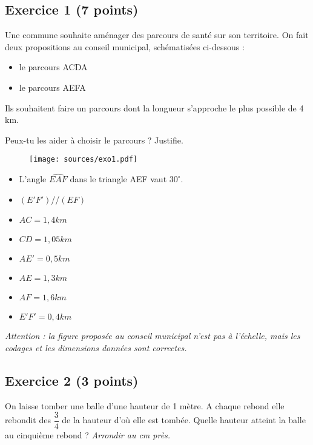 \documentclass[12pt]{article}
\begin{document}
\subsection*{Exercice 1 (7 points)}

Une commune souhaite aménager des parcours de santé sur son territoire. On fait deux propositions au conseil municipal, schématisées ci-dessous :

\begin{itemize}
\item le parcours ACDA
\item le parcours AEFA
\end{itemize}

Ils souhaitent faire un parcours dont la longueur s’approche le plus possible de 4 km.

Peux-tu les aider à choisir le parcours ? Justifie.

\begin{multicols}{2}

  \begin{figure}[H]
    \centering
    \texttt{[image: sources/exo1.pdf]}
  \end{figure}

  \begin{itemize}
  \item L’angle $\widehat{EAF}$ dans le triangle AEF vaut $30^{\circ}$.
  \item $(E' F') $\slash{}\slash{}$ (EF)$
  \item $AC = 1,4 km$
  \item $CD = 1,05 km$
  \item $AE' = 0,5 km$
  \item $AE = 1,3 km$
  \item $AF = 1,6 km$
  \item $E'F' = 0,4 km$  \\
  \end{itemize}

  \textit{Attention : la figure proposée au conseil municipal n’est pas à l’échelle, mais les codages et les dimensions données sont correctes.}
\end{multicols}

\subsection*{Exercice 2 (3 points)}

On laisse tomber une balle d’une hauteur de 1 mètre. A chaque rebond elle rebondit des $\dfrac{3}{4}$ de la hauteur d’où elle est tombée. \newline
Quelle hauteur atteint la balle au cinquième rebond ? \textit{Arrondir au cm près.}
\end{document}
